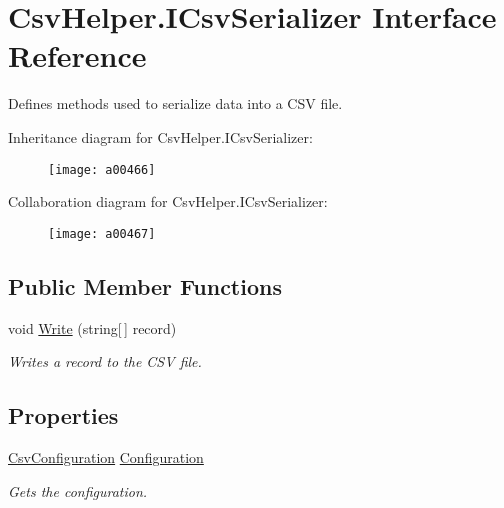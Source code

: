 \hypertarget{a00116}{\section{Csv\-Helper.\-I\-Csv\-Serializer Interface Reference}
\label{a00116}
}


Defines methods used to serialize data into a C\-S\-V file.  




Inheritance diagram for Csv\-Helper.\-I\-Csv\-Serializer\-:
\nopagebreak
\begin{figure}[H]
\begin{center}
\leavevmode
\texttt{[image: a00466]}
\end{center}
\end{figure}


Collaboration diagram for Csv\-Helper.\-I\-Csv\-Serializer\-:
\nopagebreak
\begin{figure}[H]
\begin{center}
\leavevmode
\texttt{[image: a00467]}
\end{center}
\end{figure}
\subsection*{Public Member Functions}
\begin{DoxyCompactItemize}
\item 
void \hyperlink{a00116_a0b442858eef85b7d933662359646fd0b}{Write} (string\mbox{[}$\,$\mbox{]} record)
\begin{DoxyCompactList}\small\item\em Writes a record to the C\-S\-V file. \end{DoxyCompactList}\end{DoxyCompactItemize}
\subsection*{Properties}
\begin{DoxyCompactItemize}
\item 
\hyperlink{a00063}{Csv\-Configuration} \hyperlink{a00116_a54d241fe87517707b6f85c30fe8b3a95}{Configuration}
\begin{DoxyCompactList}\small\item\em Gets the configuration. \end{DoxyCompactList}\end{DoxyCompactItemize}


